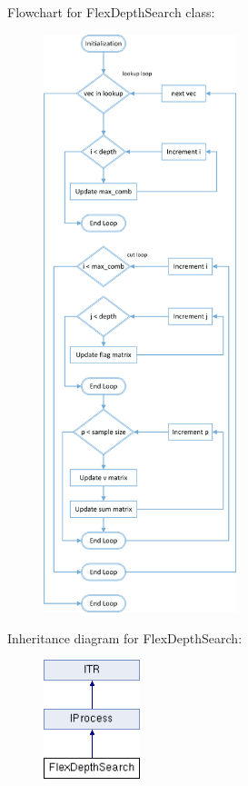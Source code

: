 \documentclass{article}
\begin{document}
Flowchart for FlexDepthSearch class:
\begin{figure}[H]
\centering
\includegraphics[width=0.5\textwidth]{FlexDepth.png}
\end{figure}

Inheritance diagram for FlexDepthSearch:
\begin{figure}[H]
\centering
\includegraphics[width=0.25\textwidth]{class_flex_depth_search.png}
\end{figure}
\end{document}
